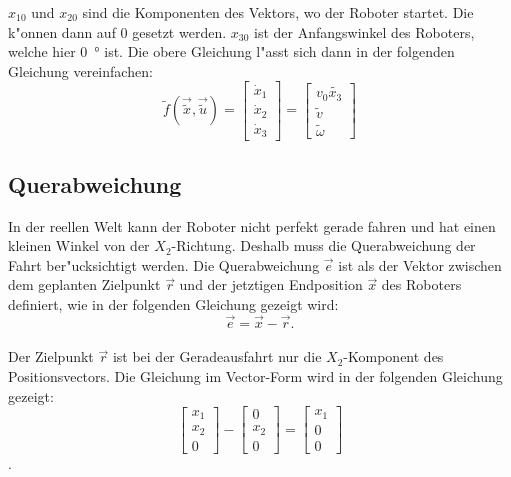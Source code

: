 \(x_{10}\) und \(x_{20}\) sind die Komponenten des Vektors, wo der Roboter startet. Die k"onnen dann auf 0 gesetzt werden. \(x_{30}\) ist der Anfangswinkel des Roboters, welche hier \si{0\degree} ist. Die obere Gleichung l"asst sich dann in der folgenden Gleichung vereinfachen:
\begin{equation}
    \widetilde{f}(\overrightarrow{\widetilde{x}}, \overrightarrow{\widetilde{u}}) =
    \begin{bmatrix*}
        \dot{x}_1 \\
        \dot{x}_2 \\
        \dot{x}_3
    \end{bmatrix*}
    = 
    \begin{bmatrix*}
        v_0\widetilde{x_3} \\
        \widetilde{v} \\
        \widetilde{\omega}
    \end{bmatrix*}
\end{equation}

\subsection{Querabweichung}

In der reellen Welt kann der Roboter nicht perfekt gerade fahren und hat einen kleinen Winkel von der \(X_2\)-Richtung. Deshalb muss die Querabweichung der Fahrt ber"ucksichtigt werden. Die Querabweichung \(\overrightarrow{e}\) ist als der Vektor zwischen dem geplanten Zielpunkt \(\overrightarrow{r}\) und der jetztigen Endposition \(\overrightarrow{x}\) des Roboters definiert, wie in der folgenden Gleichung gezeigt wird:
\begin{equation*}
    \overrightarrow{e} = \overrightarrow{x} - \overrightarrow{r}.
\end{equation*} \\

Der Zielpunkt \(\overrightarrow{r}\) ist bei der Geradeausfahrt nur die \(X_2\)-Komponent des Positionsvectors.  Die Gleichung im Vector-Form wird in der folgenden Gleichung gezeigt:
\begin{equation*}
    \begin{bmatrix}
        x_1 \\
        x_2 \\
        0
    \end{bmatrix}
    -
    \begin{bmatrix}
        0 \\
        x_2 \\
        0
    \end{bmatrix}
    =
    \begin{bmatrix}
        x_1 \\
        0 \\
        0
    \end{bmatrix}
\end{equation*}.

